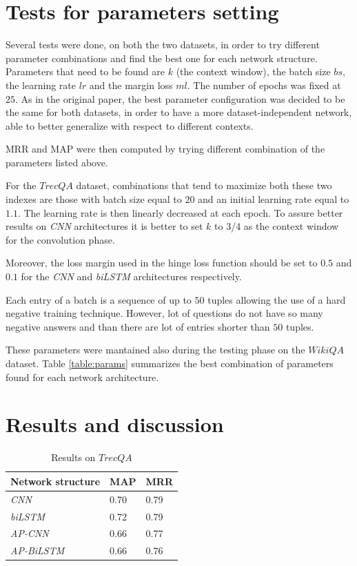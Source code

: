 \documentclass[11pt,a4paper]{article}
\begin{document}
\section{Tests for parameters setting}

Several tests were done, on both the two datasets, in order to try different parameter combinations and find the best one for each network structure. Parameters that need to be found are $k$ (the context window), the batch size $bs$, the learning rate $lr$ and the margin loss $ml$. The number of epochs was fixed at $25$. As in the original paper, the best parameter configuration was decided to be the same for both datasets, in order to have a more dataset-independent network, able to better generalize with respect to different contexts.

MRR and MAP were then computed by trying different combination of the parameters listed above. 

For the $TrecQA$ dataset, combinations that tend to maximize both these two indexes are those with batch size equal to $20$ and an initial learning rate equal to $1.1$. The learning rate is then linearly decreased at each epoch. To assure better results on \textit{CNN} architectures it is better to set $k$ to $3$/$4$ as the context window for the convolution phase. 

Moreover, the loss margin used in the hinge loss function should be set to $0.5$ and $0.1$ for the \textit{CNN} and \textit{biLSTM} architectures respectively.

Each entry of a batch is a sequence of up to $50$ tuples allowing the use of a hard negative training technique. However, lot of questions do not have so many negative answers and than there are lot of entries shorter than $50$ tuples.

These parameters were mantained also during the testing phase on the $WikiQA$ dataset. Table \ref{table:params} summarizes the best combination of parameters found for each network architecture.

\section{Results and discussion}

\begin{table}[h]
\begin{center}
\begin{tabular}{|l|l|l|}
\hline \bf Network structure & \bf MAP & \bf MRR \\ 
\hline
\textit{CNN} & 0.70 & 0.79  \\
\textit{biLSTM} & 0.72 & 0.79  \\
\textit{AP-CNN} & 0.66 & 0.77  \\
\textit{AP-BiLSTM} & 0.66 & 0.76 \\
\hline
\end{tabular}
\end{center}
\caption{Results on $TrecQA$}
\label{table:trecres}
\end{table}
\end{document}
